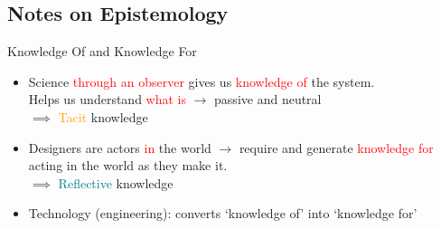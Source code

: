 \documentclass[
	11pt,
	aspectratio=169,
]{beamer}
\begin{document}
        \subsection{Notes on Epistemology}
            \begin{frame}{Knowledge Of and Knowledge For}
    		    \begin{itemize}
    		        \item<1-> Science \textcolor{red}{through an observer} gives us \textcolor{red}{knowledge of} the system. \\
    		        Helps us understand \textcolor{red}{what is} $\longrightarrow$ passive and neutral \\
    		        $\implies$ \textcolor{orange}{Tacit} knowledge
    		        \item<2-> Designers are actors \textcolor{red}{in} the world $\longrightarrow$ require and generate \textcolor{red}{knowledge for} acting in the world as they make it.\\
    		        $\implies$ \textcolor{teal}{Reflective} knowledge
    		        \item<3-> Technology (engineering): converts `knowledge of' into `knowledge for'
    		    \end{itemize}
		    \end{frame}
\end{document}
